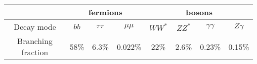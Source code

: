 \begin{tabular}{c|ccc|cccc}
                     & \multicolumn{3}{c|}{fermions} & \multicolumn{4}{c}{bosons}                         \\
  \hline
  Decay mode         & $bb$ & $\tau\tau$ & $\mu\mu$   & $WW^\ast$ & $ZZ^\ast$ & $\gamma\gamma$ & $Z\gamma$ \\
  Branching fraction & 58\% & 6.3\%     & 0.022\%    & 22\%      & 2.6\%     & 0.23\%         & 0.15\%    \\

\end{tabular}

